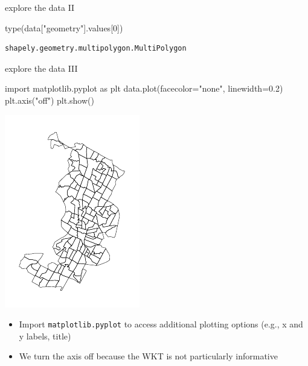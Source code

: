 \documentclass[
  ignorenonframetext,
]{beamer}
\newenvironment{Shaded}{\begin{snugshade}}{\end{snugshade}}
\newcommand{\BuiltInTok}[1]{\textcolor[rgb]{0.00,0.23,0.31}{#1}}
\newcommand{\DecValTok}[1]{\textcolor[rgb]{0.68,0.00,0.00}{#1}}
\newcommand{\FloatTok}[1]{\textcolor[rgb]{0.68,0.00,0.00}{#1}}
\newcommand{\ImportTok}[1]{\textcolor[rgb]{0.00,0.46,0.62}{#1}}
\newcommand{\NormalTok}[1]{\textcolor[rgb]{0.00,0.23,0.31}{#1}}
\newcommand{\OperatorTok}[1]{\textcolor[rgb]{0.37,0.37,0.37}{#1}}
\newcommand{\StringTok}[1]{\textcolor[rgb]{0.13,0.47,0.30}{#1}}
\providecommand{\tightlist}{%
  \setlength{\itemsep}{0pt}\setlength{\parskip}{0pt}}\usepackage{longtable,booktabs,array}
\begin{document}
\begin{frame}[fragile]{explore the data II}
\label{explore-the-data-ii}
\begin{Shaded}
\begin{Highlighting}[]
\BuiltInTok{type}\NormalTok{(data[}\StringTok{"geometry"}\NormalTok{].values[}\DecValTok{0}\NormalTok{])}
\end{Highlighting}
\end{Shaded}

\begin{verbatim}
shapely.geometry.multipolygon.MultiPolygon
\end{verbatim}
\end{frame}

\begin{frame}[fragile]{explore the data III}
\label{explore-the-data-iii}
\begin{Shaded}
\begin{Highlighting}[]
\ImportTok{import}\NormalTok{ matplotlib.pyplot }\ImportTok{as}\NormalTok{ plt}
\NormalTok{data.plot(facecolor}\OperatorTok{=}\StringTok{"none"}\NormalTok{, linewidth}\OperatorTok{=}\FloatTok{0.2}\NormalTok{)}
\NormalTok{plt.axis(}\StringTok{"off"}\NormalTok{)}
\NormalTok{plt.show()}
\end{Highlighting}
\end{Shaded}

\includegraphics{spatial_2_files/figure-beamer/cell-15-output-1.pdf}

\begin{itemize}
\tightlist
\item
  Import \texttt{matplotlib.pyplot} to access additional plotting
  options (e.g., x and y labels, title)
\item
  We turn the axis off because the WKT is not particularly informative
\end{itemize}
\end{frame}
\end{document}
